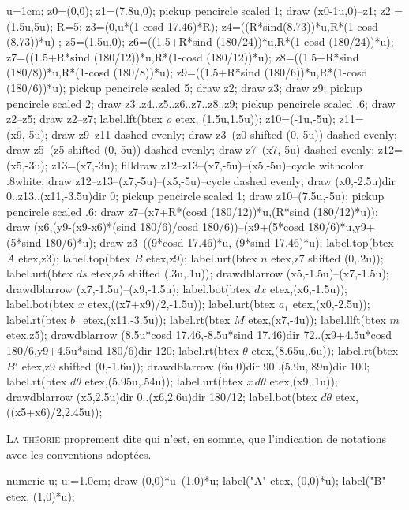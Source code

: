\documentclass[12pt,a4paper,twocolumn]{book} %
\begin{document}
\begin{mpdisplay}
u=1cm;
z0=(0,0);
z1=(7.8u,0);
pickup pencircle scaled 1;
draw (x0-1u,0)--z1;
z2 = (1.5u,5u);
R=5;
z3=(0,u*(1-cosd 17.46)*R);
z4=((R*sind(8.73))*u,R*(1-cosd (8.73))*u) ;
z5=(1.5u,0);
z6=((1.5+R*sind (180/24))*u,R*(1-cosd (180/24))*u);
z7=((1.5+R*sind (180/12))*u,R*(1-cosd (180/12))*u);
z8=((1.5+R*sind (180/8))*u,R*(1-cosd (180/8))*u);
z9=((1.5+R*sind (180/6))*u,R*(1-cosd (180/6))*u);
pickup pencircle scaled 5;
draw z2;
draw z3;
draw z9;
pickup pencircle scaled 2;
draw z3..z4..z5..z6..z7..z8..z9;
pickup pencircle scaled .6;
draw z2--z5;
draw z2--z7;
label.lft(btex $\rho$ etex, (1.5u,1.5u));
z10=(-1u,-5u);
z11=(x9,-5u);
draw z9--z11 dashed evenly;
draw z3--(z0 shifted (0,-5u)) dashed evenly;
draw z5--(z5 shifted (0,-5u)) dashed evenly;
draw z7--(x7,-5u) dashed evenly;
z12=(x5,-3u);
z13=(x7,-3u);
filldraw z12--z13--(x7,-5u)--(x5,-5u)--cycle withcolor .8white;
draw z12--z13--(x7,-5u)--(x5,-5u)--cycle dashed evenly;
draw (x0,-2.5u){dir 0}..z13..(x11,-3.5u){dir 0};
pickup pencircle scaled 1;
draw z10--(7.5u,-5u);
pickup pencircle scaled .6;
draw z7--(x7+R*(cosd (180/12))*u,(R*sind (180/12)*u));
draw (x6,(y9-(x9-x6)*(sind 180/6)/cosd 180/6))--(x9+(5*cosd 180/6)*u,y9+(5*sind 180/6)*u);
draw z3--((9*cosd 17.46)*u,-(9*sind 17.46)*u);
label.top(btex $A$ etex,z3);
label.top(btex $B$ etex,z9);
label.urt(btex $n$ etex,z7 shifted (0,.2u));
label.urt(btex $ds$ etex,z5 shifted (.3u,.1u));
drawdblarrow (x5,-1.5u)--(x7,-1.5u);
drawdblarrow (x7,-1.5u)--(x9,-1.5u);
label.bot(btex $dx$ etex,(x6,-1.5u));
label.bot(btex $x$ etex,((x7+x9)/2,-1.5u));
label.urt(btex $a_1$ etex,(x0,-2.5u));
label.rt(btex $b_1$ etex,(x11,-3.5u));
label.rt(btex $M$ etex,(x7,-4u));
label.llft(btex $m$ etex,z5);
drawdblarrow (8.5u*cosd 17.46,-8.5u*sind 17.46){dir 72}..(x9+4.5u*cosd 180/6,y9+4.5u*sind 180/6){dir 120};
label.rt(btex $\theta$ etex,(8.65u,.6u));
label.rt(btex $B'$ etex,z9 shifted (0,-1.6u));
drawdblarrow (6u,0){dir 90}..(5.9u,.89u){dir 100};
label.rt(btex $d\theta$ etex,(5.95u,.54u));
label.urt(btex $x\,d\theta$ etex,(x9,.1u));
drawdblarrow (x5,2.5u){dir 0}..(x6,2.6u){dir 180/12};
label.bot(btex $d\theta$ etex,((x5+x6)/2,2.45u));
\end{mpdisplay}



\lettrine{L}{a théorie} proprement dite qui n'est, en somme, que l'indication
de notations avec les conventions adoptées.

\begin{mpdisplay}
    numeric u; u:=1.0cm;
    draw (0,0)*u--(1,0)*u;
    label(\btex "A" etex, (0,0)*u);
    label(\btex "B" etex, (1,0)*u);
\end{mpdisplay}
\end{document}
